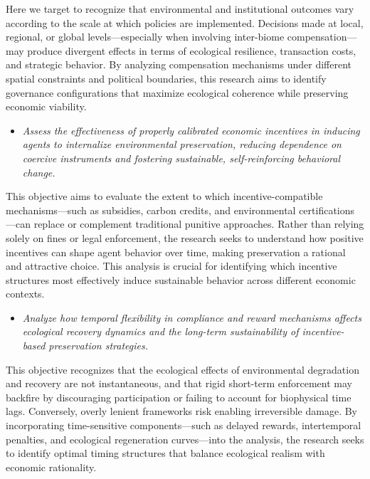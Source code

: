 Here we target to recognize that environmental and institutional outcomes vary according to the scale at which policies are implemented. Decisions made at local, regional, or global levels—especially when involving inter-biome compensation—may produce divergent effects in terms of ecological resilience, transaction costs, and strategic behavior. By analyzing compensation mechanisms under different spatial constraints and political boundaries, this research aims to identify governance configurations that maximize ecological coherence while preserving economic viability.

\begin{itemize}

    \item[\textbf{G4.}]
    
    \textit{Assess the effectiveness of properly calibrated economic incentives in inducing agents to internalize environmental preservation, reducing dependence on coercive instruments and fostering sustainable, self-reinforcing behavioral change.}
    
\end{itemize}

This objective aims to evaluate the extent to which incentive-compatible mechanisms—such as subsidies, carbon credits, and environmental certifications—can replace or complement traditional punitive approaches. Rather than relying solely on fines or legal enforcement, the research seeks to understand how positive incentives can shape agent behavior over time, making preservation a rational and attractive choice. This analysis is crucial for identifying which incentive structures most effectively induce sustainable behavior across different economic contexts.

\begin{itemize}

    \item[\textbf{G5.}]  
    
    \textit{Analyze how temporal flexibility in compliance and reward mechanisms affects ecological recovery dynamics and the long-term sustainability of incentive-based preservation strategies.}
    
\end{itemize}

This objective recognizes that the ecological effects of environmental degradation and recovery are not instantaneous, and that rigid short-term enforcement may backfire by discouraging participation or failing to account for biophysical time lags. Conversely, overly lenient frameworks risk enabling irreversible damage. By incorporating time-sensitive components—such as delayed rewards, intertemporal penalties, and ecological regeneration curves—into the analysis, the research seeks to identify optimal timing structures that balance ecological realism with economic rationality.

